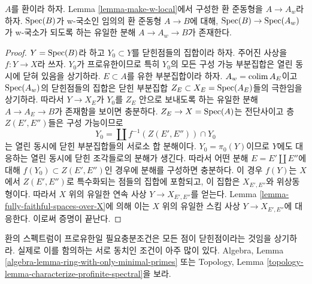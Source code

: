 \begin{lemma}[구성의 보편 성질]
\label{lemma-universal}
$A$를 환이라 하자. Lemma \ref{lemma-make-w-local}에서 구성한
환 준동형을 $A \to A_w$라 하자.
$\mathop{\mathrm{Spec}}(B)$가 w-국소인 임의의 환 준동형 $A \to B$에 대해,
$\mathop{\mathrm{Spec}}(B) \to \mathop{\mathrm{Spec}}(A_w)$가 w-국소가 되도록 하는 유일한 분해
$A \to A_w \to B$가 존재한다.
\end{lemma}

\begin{proof}
$Y = \mathop{\mathrm{Spec}}(B)$라 하고 $Y_0 \subset Y$를 닫힌점들의 집합이라 하자.
주어진 사상을 $f : Y \to X$라 쓰자.
$Y_0$가 프로유한이므로 특히 $Y_0$의 모든 구성 가능 부분집합은
열린 동시에 닫혀 있음을 상기하라.
$E \subset A$를 유한 부분집합이라 하자.
$A_w = \mathop{\mathrm{colim}}\nolimits A_E$이고 $\mathop{\mathrm{Spec}}(A_w)$의 닫힌점들의 집합은
닫힌 부분집합 $Z_E \subset X_E = \mathop{\mathrm{Spec}}(A_E)$들의 극한임을 상기하라.
따라서 $Y \to X_E$가 $Y_0$를 $Z_E$ 안으로 보내도록 하는
유일한 분해 $A \to A_E \to B$가 존재함을 보이면 충분하다.
$Z_E \to X = \mathop{\mathrm{Spec}}(A)$는 전단사이고 층 $Z(E', E'')$들은
구성 가능이므로
$$
Y_0 = \coprod f^{-1}(Z(E', E'')) \cap Y_0
$$
는 열린 동시에 닫힌 부분집합들의 서로소 합 분해이다.
$Y_0 = \pi_0(Y)$이므로 $Y$에도 대응하는 열린 동시에 닫힌
조각들로의 분해가 생긴다.
따라서 어떤 분해 $E = E' \amalg E''$에 대해
$f(Y_0) \subset Z(E', E'')$인 경우에 분해를 구성하면 충분하다.
이 경우 $f(Y)$는 $X$에서 $Z(E', E'')$로 특수화되는 점들의 집합에
포함되고, 이 집합은 $X_{E', E''}$와 위상동형이다.
따라서 $X$ 위의 유일한 연속 사상 $Y \to X_{E', E''}$를 얻는다.
Lemma \ref{lemma-fully-faithful-spaces-over-X}에 의해 이는
$X$ 위의 유일한 스킴 사상 $Y \to X_{E', E''}$에 대응한다.
이로써 증명이 끝난다.
\end{proof}

\noindent
환의 스펙트럼이 프로유한일 필요충분조건은 모든 점이 닫힌점이라는
것임을 상기하라. 실제로 이를 함의하는 서로 동치인 조건이 아주 많이 있다.
Algebra, Lemma \ref{algebra-lemma-ring-with-only-minimal-primes} 또는
Topology, Lemma \ref{topology-lemma-characterize-profinite-spectral}을 보라.

